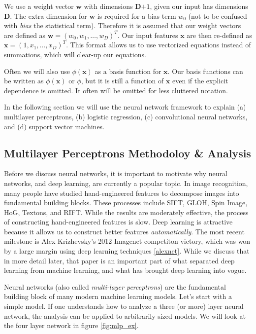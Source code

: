 \documentclass[11pt]{article}
\begin{document}
We use a weight vector $\mathbf{w}$ with dimensions \textbf{D$+1$}, given our input has dimensions \textbf{D}. The extra dimension for $\mathbf{w}$ is required for a bias term $w_0$ (not to be confused with \emph{bias} the statistical term). Therefore it is assumed that our weight vectors are defined as $\mathbf{w} = (w_{0},w_{1},\ldots,w_{D})^{T}$. Our input features $\mathbf{x}$ are then re-defined as $\mathbf{x} = (1,x_{1},\ldots,x_{D})^{T}$. This format allows us to use vectorized equations instead of summations, which will clear-up our equations. 

Often we will also use $\phi(\mathbf{x})$ as a basis function for $\mathbf{x}$. Our basis functions can be written as $\phi(\mathbf{x})$ or $\phi$, but it is still a function of $\mathbf{x}$ even if the explicit dependence is omitted. It often will be omitted for less cluttered notation.

\par
In the following section we will use the neural network framework to explain (a) multilayer perceptrons, (b) logistic regression, (c) convolutional neural networks, and (d) support vector machines. 

\subsection{Multilayer Perceptrons Methodoloy \&  Analysis}

\par
Before we discuss neural networks, it is important to motivate why neural networks, and deep learning, are currently a popular topic. In image recognition, many people have studied hand-engineered features to decompose images into fundamental building blocks. These processes include SIFT, GLOH, Spin Image, HoG, Textons, and RIFT. While the results are moderately effective, the process of constructing hand-engineered features is slow. Deep learning is attractive because it allows us to construct better features \emph{automatically}. The most recent milestone is Alex Krizhevsky's 2012 Imagenet competiton victory, which was won by a large margin using deep learning techniques \ref{alexnet}. While we discuss that in more detail later, that paper is an important part of what separated deep learning from machine learning, and what has brought deep learning into vogue.

\par
Neural networks (also called \emph{multi-layer perceptrons}) are the fundamental building block of many modern machine learning models. Let's start with a simple model. If one understands how to analyze a three (or more) layer neural network, the analysis can be applied to arbitrarily sized models. We will look at the four layer network in figure \ref{fig:mlp_ex}.
\end{document}
